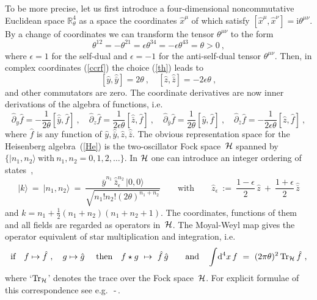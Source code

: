 \documentclass[a4paper,11pt]{article}
\numberwithin{equation}{section}
\def\th{\theta}
\def\e{\epsilon}
\def\sfrac#1#2{{\textstyle\frac{#1}{#2}}}
\def\pa{\partial}
\newcommand{\im}{\mathrm{i}}
\newcommand{\diff}{\mathrm{d}}
\newcommand{\zb}{{\bar{z}}}
\newcommand{\yb}{{\bar{y}}}
\newcommand{\rct}{{\mathbb{R}^4_\theta}}
\newcommand{\Hcal}{{\cal H}}
\newcommand{\fh}{\hat{f}}
\newcommand{\gh}{\hat{g}}
\def\>{\rangle}
\begin{document}
To be more precise, let us first introduce a four-dimensional noncommutative 
Euclidean space $\rct$ as a space the coordinates $\hat{x}^\mu$ of which 
satisfy $[\hat{x}^\mu,\hat{x}^\nu]=\im\theta^{\mu\nu}$. By a change of 
coordinates we can transform the tensor $\theta^{\mu\nu}$ to the form
 \begin{equation}\label{th}
\theta^{12}= -\theta^{21}=\e\theta^{34}=-\e\theta^{43}=\th >0\ ,
\end{equation}
where $\e =1$ for the self-dual and $\e = -1$ for the anti-self-dual tensor
$\th^{\mu\nu}$.
Then, in complex coordinates (\ref{ccrf}) the choice (\ref{th}) leads to
\begin{equation}\label{He}
[\hat y,\hat \yb]=2\th\ ,  \quad [\hat z, \hat \zb]=-2\e\th\ ,
\end{equation}
and other commutators are zero.
The coordinate derivatives are now inner derivations of the algebra of functions, i.e.
\begin{equation}\label{der}
\hat\pa_y \hat f = -\frac{1}{2\th} [\hat\yb,\hat f]\ , 
\quad \hat\pa_z \hat f =\frac{1}{2\e\th}[\hat\zb,\hat f]\ ,
\quad
\hat \pa_{\yb} \hat f = \frac{1}{2\th} [\hat y,\hat f]\ , 
\quad \hat\pa_{\zb} \hat f =-\frac{1}{2\e\th}[\hat z,\hat f]\ ,
\end{equation}
where $\hat f$ is any function of $\hat y, \hat \yb, \hat z, \hat \zb$.
The obvious representation space for the Heisenberg algebra~(\ref{He})
is the two-oscillator Fock space~$\Hcal$ spanned by 
$\{ |n_1,n_2\>\ \textrm{with}\ n_1,n_2=0,1,2,\ldots\}$.
In $\Hcal$ one can introduce an integer ordering of states~\cite{Rangamani:2001cn},
\begin{equation} \label{fock}
|k\>\ =\ |n_1,n_2\> \ =\
\frac{\hat\yb^{n_1}\,\hat\zb_\e^{n_2}\,|0,0\>}
{\sqrt{n_1!n_2!(2\th)^{n_1+n_2}}}
\qquad\textrm{with}\qquad
\hat{z}_\e\ :=\ 
\sfrac{1-\e}{2}\,\hat{z}\ +\ \sfrac{1+\e}{2}\,\hat{\bar{z}}
\end{equation}
and $k=n_1+\sfrac{1}{2}(n_1+n_2)(n_1+n_2+1)$.
The coordinates, functions of them  and all fields  are  regarded as 
operators in~$\Hcal$. The Moyal-Weyl map gives the operator equivalent 
of star multiplication and integration, i.e.
\begin{equation} \label{trace}
\textrm{if}\quad f\mapsto\fh\ , \quad  g\mapsto\gh\  \quad \textrm{then}\quad
f\star g\ \mapsto\ \fh\,\gh \qquad\textrm{and}\quad
\int\! \diff^4{x}\,f\ =\
(2\pi \theta)^2 \,\mbox{Tr}_\Hcal\, \fh\ ,
\end{equation} 
where `$\mbox{Tr}_\Hcal$' denotes the trace over the Fock space~$\Hcal$. For
explicit formulae of this correspondence see 
e.g.~\cite{Nekrasov}\,-\,\cite{Konechny:2001}.
\end{document}
